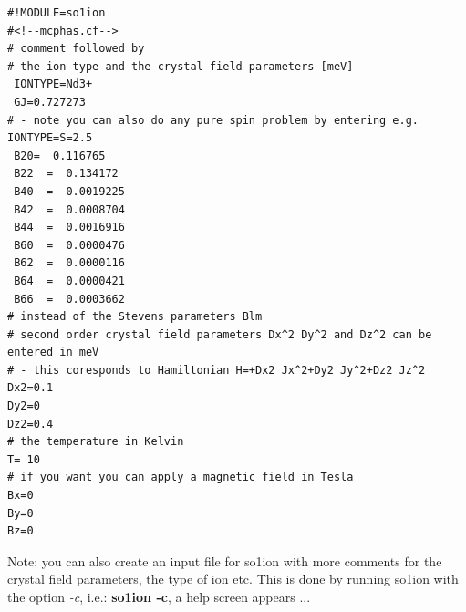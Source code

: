 \begin{verbatim}
#!MODULE=so1ion
#<!--mcphas.cf-->
# comment followed by
# the ion type and the crystal field parameters [meV]
 IONTYPE=Nd3+
 GJ=0.727273
# - note you can also do any pure spin problem by entering e.g. IONTYPE=S=2.5 
 B20=  0.116765                                           
 B22  =  0.134172                                           
 B40  =  0.0019225                                          
 B42  =  0.0008704                                          
 B44  =  0.0016916                                          
 B60  =  0.0000476                                          
 B62  =  0.0000116                                          
 B64  =  0.0000421                                          
 B66  =  0.0003662       
# instead of the Stevens parameters Blm 
# second order crystal field parameters Dx^2 Dy^2 and Dz^2 can be entered in meV
# - this coresponds to Hamiltonian H=+Dx2 Jx^2+Dy2 Jy^2+Dz2 Jz^2
Dx2=0.1
Dy2=0
Dz2=0.4
# the temperature in Kelvin
T= 10
# if you want you can apply a magnetic field in Tesla
Bx=0
By=0
Bz=0
\end{verbatim}

Note: you can also create an input file for so1ion with more comments for the crystal field
parameters, the type of ion etc. This is done by running {\prg so1ion} with the
option {\em -c}, i.e.: {\bf so1ion -c}, a help screen appears ...

